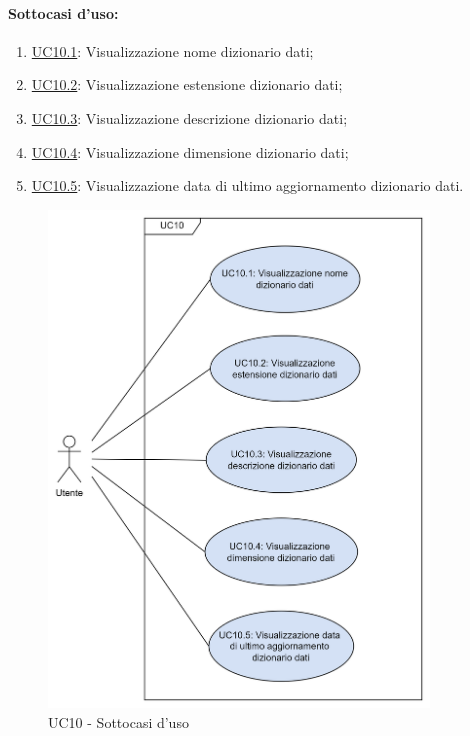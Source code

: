 \paragraph*{Sottocasi d'uso:}
\begin{enumerate}
  \item \hyperref[UC10point1]{UC10.1}: Visualizzazione nome dizionario dati;
  \item \hyperref[UC10point2]{UC10.2}: Visualizzazione estensione dizionario dati;
  \item \hyperref[UC10point3]{UC10.3}: Visualizzazione descrizione dizionario dati;
  \item \hyperref[UC10point4]{UC10.4}: Visualizzazione dimensione dizionario dati;
  \item \hyperref[UC10point5]{UC10.5}: Visualizzazione data di ultimo aggiornamento dizionario dati.
\end{enumerate}

\begin{figure}[H]
  \centering
  \includegraphics[width=0.90\textwidth]{assets/uc10.png}
  \caption{UC10 - Sottocasi d'uso}
\end{figure}


